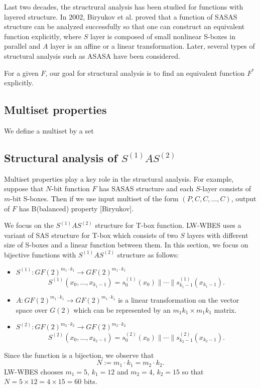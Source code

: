 \documentclass{ieeeaccess}
\begin{document}
Last two decades, 
the structrural analysis has been studied for functions with layered structure.
In 2002, Biryukov et al. proved that a function of SASAS structure
can be analyzed successfully so that one can construct an equivalent function 
explicitly, where $S$ layer is composed of small nonlinear S-boxes in parallel
and $A$ layer is an affine or a linear transformation.
Later, several types of structural analysis such as ASASA have been considered.


For a given $F$, our goal for structural analysis is 
to find an equivalent function $F^*$ explicitly.

\subsection{Multiset properties}

We define a multiset by a set 


\subsection{Structural analysis of $S^{(1)}AS^{(2)}$}

Multiset properties play a key role in the structural analysis.
For example, suppose that $N$-bit function $F$ has SASAS structure
and each $S$-layer consists of $m$-bit S-boxes.
Then if we use input multiset of the form $(P,C,C,\ldots, C)$,
output  of $F$ has B(balanced) property [Biryukov].

We focus on the $S^{(1)}AS^{(2)}$ structure for T-box function.
LW-WBES uses a variant of SAS structure for T-box which
consists of two $S$ layers with different size of S-boxes and a linear function
between them.
In this section, we focus on bijective functions with $S^{(1)}AS^{(2)}$ structure as follows:
\begin{itemize}
\item $S^{(1)}: GF(2)^{m_1 \cdot k_1} \to GF(2)^{m_1 \cdot k_1}$ 
\[
S^{(1)}(x_0, \ldots, x_{k_1-1}) = s^{(1)}_0(x_0) \| \cdots \| s^{(1)}_{k_1-1}(x_{k_1-1}).
\]
\item $A: GF(2)^{m_1 \cdot k_1} \to GF(2)^{m_1 \cdot k_1}$  is a linear transformation
on the vector space over $G(2)$ which can be represented by
an $m_1 k_1 \times m_1 k_1$ matrix.
\item $S^{(2)}: GF(2)^{m_2 \cdot k_2} \to GF(2)^{m_2 \cdot k_2}$ 
\[
S^{(2)}(x_0, \ldots, x_{k_2-1}) = s^{(2)}_0(x_0) \| \cdots \| s^{(2)}_{k_2-1}(x_{k_2-1}).
\]
\end{itemize}
Since the function is a bijection, we observe that
\[
N:=m_1\cdot k_1 = m_2\cdot k_2.
\]
LW-WBES chooses $m_1 = 5$, $k_1 =12$ and
$m_2=4$, $k_2 = 15$ so that $N=5\times 12 =4\times 15= 60$ bits.
\end{document}
